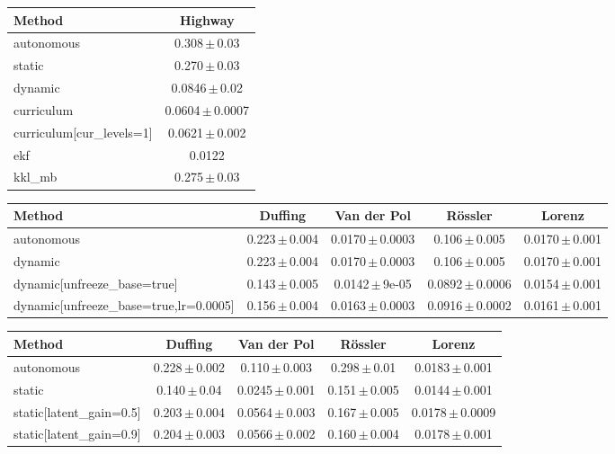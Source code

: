 \begin{tabular}{lc}
\toprule
Method & Highway \\
\midrule
autonomous & 0.308\,$\pm$\,0.03 \\
static & 0.270\,$\pm$\,0.03 \\
dynamic & 0.0846\,$\pm$\,0.02 \\
curriculum & 0.0604\,$\pm$\,0.0007 \\
curriculum[cur\_levels=1] & 0.0621\,$\pm$\,0.002 \\
ekf & 0.0122 \\
kkl\_mb & 0.275\,$\pm$\,0.03 \\
\bottomrule
\end{tabular}

\begin{tabular}{lcccc}
\toprule
Method & Duffing & Van der Pol & R\"ossler & Lorenz \\
\midrule
autonomous & 0.223\,$\pm$\,0.004 & 0.0170\,$\pm$\,0.0003 & 0.106\,$\pm$\,0.005 & 0.0170\,$\pm$\,0.001 \\
dynamic & 0.223\,$\pm$\,0.004 & 0.0170\,$\pm$\,0.0003 & 0.106\,$\pm$\,0.005 & 0.0170\,$\pm$\,0.001 \\
dynamic[unfreeze\_base=true] & 0.143\,$\pm$\,0.005 & 0.0142\,$\pm$\,9e-05 & 0.0892\,$\pm$\,0.0006 & 0.0154\,$\pm$\,0.001 \\
dynamic[unfreeze\_base=true,lr=0.0005] & 0.156\,$\pm$\,0.004 & 0.0163\,$\pm$\,0.0003 & 0.0916\,$\pm$\,0.0002 & 0.0161\,$\pm$\,0.001 \\
\bottomrule
\end{tabular}

\begin{tabular}{lcccc}
\toprule
Method & Duffing & Van der Pol & R\"ossler & Lorenz \\
\midrule
autonomous & 0.228\,$\pm$\,0.002 & 0.110\,$\pm$\,0.003 & 0.298\,$\pm$\,0.01 & 0.0183\,$\pm$\,0.001 \\
static & 0.140\,$\pm$\,0.04 & 0.0245\,$\pm$\,0.001 & 0.151\,$\pm$\,0.005 & 0.0144\,$\pm$\,0.001 \\
static[latent\_gain=0.5] & 0.203\,$\pm$\,0.004 & 0.0564\,$\pm$\,0.003 & 0.167\,$\pm$\,0.005 & 0.0178\,$\pm$\,0.0009 \\
static[latent\_gain=0.9] & 0.204\,$\pm$\,0.003 & 0.0566\,$\pm$\,0.002 & 0.160\,$\pm$\,0.004 & 0.0178\,$\pm$\,0.001 \\
\bottomrule
\end{tabular}
